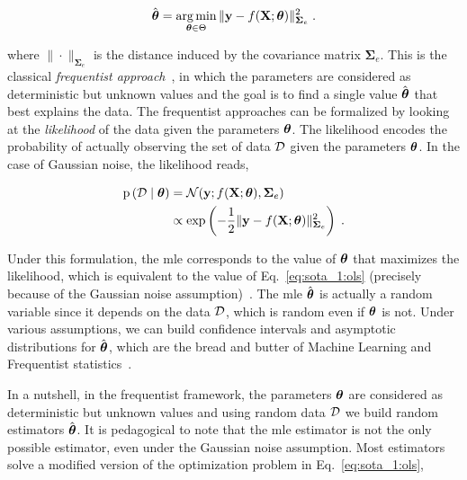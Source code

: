 \begin{equation}
    \hat{\boldsymbol{\theta}} = \operatorname*{arg\,min}_{\boldsymbol{\theta} \in \Theta} \| \mathbf{y} - f(\mathbf{X};\boldsymbol{\theta}) \|^2_{\boldsymbol{\Sigma}_e} \;.
    \label{eq:sota_1:ols}
\end{equation}

where $\|\cdot\|_{\boldsymbol{\Sigma}_e}$ is the distance induced by the covariance matrix $\boldsymbol{\Sigma}_e$. This is the classical \textit{frequentist approach}~\cite{freq_calibration}, in which the parameters are considered as deterministic but unknown values and the goal is to find a single value $\hat{\boldsymbol{\theta}}$ that best explains the data. The frequentist approaches can be formalized by looking at the \textit{likelihood} of the data given the parameters $\boldsymbol{\theta}$. The likelihood encodes the probability of actually observing the set of data $\mathcal{D}$ given the parameters $\boldsymbol{\theta}$. In the case of Gaussian noise, the likelihood reads,

\begin{equation}
    \left. 
        \begin{aligned}
            \mathrm{p} \left( \mathcal{D} \mid \boldsymbol{\theta} \right) &= \mathcal{N}(\mathbf{y}; f(\mathbf{X};\boldsymbol{\theta}), \boldsymbol{\Sigma}_e)\\
            &\propto \exp \left( -\frac{1}{2} \|\mathbf{y} - f(\mathbf{X};\boldsymbol{\theta})\|_{\boldsymbol{\Sigma}_e}^2 \right) \;.
        \end{aligned}
    \right.
\end{equation}

Under this formulation, the \gls{mle} corresponds to the value of $\boldsymbol{\theta}$ that maximizes the likelihood, which is equivalent to the value of Eq.~\eqref{eq:sota_1:ols} (precisely because of the Gaussian noise assumption)~\cite{Golberg2010,Seber2005}. The \gls{mle} $\hat{\boldsymbol{\theta}}$ is actually a random variable since it depends on the data $\mathcal{D}$, which is random even if $\boldsymbol{\theta}$ is not. Under various assumptions, we can build confidence intervals and asymptotic distributions for $\hat{\boldsymbol{\theta}}$, which are the bread and butter of Machine Learning and Frequentist statistics~\cite{freq_calibration,uq_theory}.

\smallskip
In a nutshell, in the frequentist framework, the parameters $\boldsymbol{\theta}$ are considered as deterministic but unknown values and using random data $\mathcal{D}$ we build random estimators $\hat{\boldsymbol{\theta}}$. It is pedagogical to note that the \gls{mle} estimator is not the only possible estimator, even under the Gaussian noise assumption. Most estimators solve a modified version of the optimization problem in Eq.~\eqref{eq:sota_1:ols}, 

